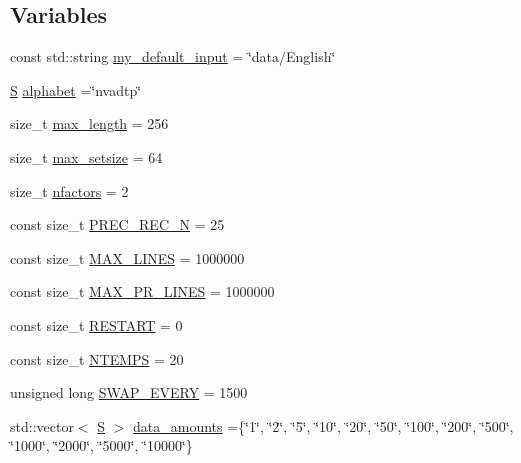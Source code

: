 \subsection*{Variables}
\begin{DoxyCompactItemize}
\item 
const std\+::string \hyperlink{_models_2_formal_language_theory-_complex_2_main_8cpp_aff5a98e66ee22e2c2547530190ecfd3d}{my\+\_\+default\+\_\+input} = \char`\"{}data/English\char`\"{}
\item 
\hyperlink{_models_2_formal_language_theory-_complex_2_main_8cpp_a51c40915539205f0b5add30b0d68a4cb}{S} \hyperlink{_models_2_formal_language_theory-_complex_2_main_8cpp_ad762aabf5f551e4c7632fb389b3e2209}{alphabet} =\char`\"{}nvadtp\char`\"{}
\item 
size\+\_\+t \hyperlink{_models_2_formal_language_theory-_complex_2_main_8cpp_aa94da4036d516add23ae35c670300c32}{max\+\_\+length} = 256
\item 
size\+\_\+t \hyperlink{_models_2_formal_language_theory-_complex_2_main_8cpp_aafa4cc7b8a249ecb81ad63ca7a2a6150}{max\+\_\+setsize} = 64
\item 
size\+\_\+t \hyperlink{_models_2_formal_language_theory-_complex_2_main_8cpp_abbce8dbfea6f30b87265ddd94cb933f7}{nfactors} = 2
\item 
const size\+\_\+t \hyperlink{_models_2_formal_language_theory-_complex_2_main_8cpp_a948185958f7efc05b85ac4084d82e3b9}{P\+R\+E\+C\+\_\+\+R\+E\+C\+\_\+N} = 25
\item 
const size\+\_\+t \hyperlink{_models_2_formal_language_theory-_complex_2_main_8cpp_a40344102d720622016c257aa59a33b6d}{M\+A\+X\+\_\+\+L\+I\+N\+ES} = 1000000
\item 
const size\+\_\+t \hyperlink{_models_2_formal_language_theory-_complex_2_main_8cpp_a5923038d8dfed7c8eaac4111396b490f}{M\+A\+X\+\_\+\+P\+R\+\_\+\+L\+I\+N\+ES} = 1000000
\item 
const size\+\_\+t \hyperlink{_models_2_formal_language_theory-_complex_2_main_8cpp_ada34ee41f51e229e0d5e00b99aed5991}{R\+E\+S\+T\+A\+RT} = 0
\item 
const size\+\_\+t \hyperlink{_models_2_formal_language_theory-_complex_2_main_8cpp_a6aa2c568bc3a4f1e1f586980b31b6699}{N\+T\+E\+M\+PS} = 20
\item 
unsigned long \hyperlink{_models_2_formal_language_theory-_complex_2_main_8cpp_a30d8f792c547d6073063d862794d030a}{S\+W\+A\+P\+\_\+\+E\+V\+E\+RY} = 1500
\item 
std\+::vector$<$ \hyperlink{_models_2_formal_language_theory-_complex_2_main_8cpp_a51c40915539205f0b5add30b0d68a4cb}{S} $>$ \hyperlink{_models_2_formal_language_theory-_complex_2_main_8cpp_acb338cf650cba49a5be5dabfffad0dbd}{data\+\_\+amounts} =\{\char`\"{}1\char`\"{}, \char`\"{}2\char`\"{}, \char`\"{}5\char`\"{}, \char`\"{}10\char`\"{}, \char`\"{}20\char`\"{}, \char`\"{}50\char`\"{}, \char`\"{}100\char`\"{}, \char`\"{}200\char`\"{}, \char`\"{}500\char`\"{}, \char`\"{}1000\char`\"{}, \char`\"{}2000\char`\"{}, \char`\"{}5000\char`\"{}, \char`\"{}10000\char`\"{}\}

\end{DoxyCompactItemize}
